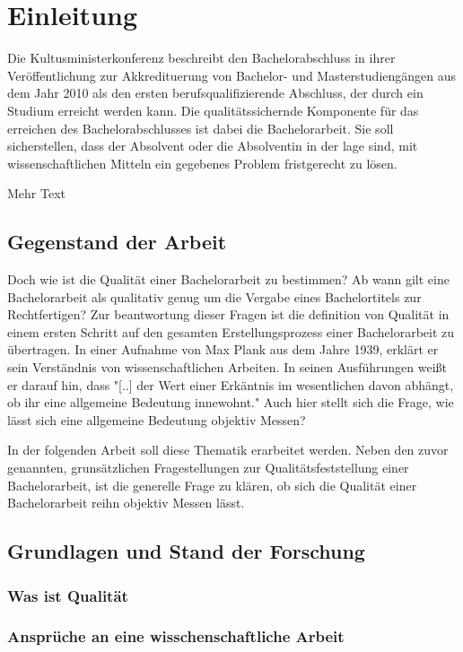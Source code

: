 
\chapter{Einleitung}
Die Kultusministerkonferenz beschreibt den Bachelorabschluss in ihrer Veröffentlichung zur Akkredituerung von Bachelor- und Masterstudiengängen aus dem Jahr 2010 als den ersten berufsqualifizierende Abschluss, der durch ein Studium erreicht werden kann. Die qualitätssichernde Komponente für das erreichen des Bachelorabschlusses ist dabei die Bachelorarbeit. Sie soll sicherstellen, dass der Absolvent oder die Absolventin in der lage sind, mit wissenschaftlichen Mitteln ein gegebenes Problem fristgerecht zu lösen.\cite[Vgl.][S.4]{kmk:2010}

Mehr Text


\section{Gegenstand der Arbeit}
Doch wie ist die Qualität einer Bachelorarbeit zu bestimmen? Ab wann gilt eine Bachelorarbeit als qualitativ genug um die Vergabe eines Bachelortitels zur Rechtfertigen? Zur beantwortung dieser Fragen ist die definition von Qualität in einem ersten Schritt auf den gesamten Erstellungsprozess einer Bachelorarbeit zu übertragen. 
In einer Aufnahme von Max Plank aus dem Jahre 1939, erklärt er sein Verständnis von wissenschaftlichen Arbeiten. In seinen Ausführungen weißt er darauf hin, dass "[..]  der Wert einer Erkäntnis im wesentlichen davon abhängt, ob ihr eine allgemeine Bedeutung innewohnt."\cite{Herneck:1976}
Auch hier stellt sich die Frage, wie lässt sich eine allgemeine Bedeutung objektiv Messen? 

In der folgenden Arbeit soll diese Thematik erarbeitet werden. Neben den zuvor genannten, grunsätzlichen Fragestellungen zur Qualitätsfeststellung einer Bachelorarbeit, ist die generelle Frage zu klären, ob sich die Qualität einer Bachelorarbeit reihn objektiv Messen lässt. 


\section{Grundlagen und Stand der Forschung}
\subsection{Was ist Qualität}

\subsection{Ansprüche an eine wisschenschaftliche Arbeit}

